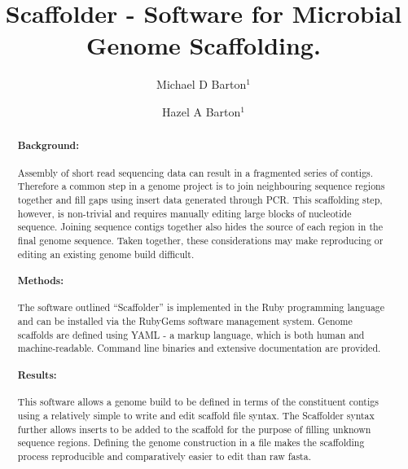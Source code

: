 \documentclass[10pt]{bmc_article}
\newenvironment{bmcformat}{\begin{raggedright}\baselineskip20pt\sloppy\setboolean{publ}{false}}{\end{raggedright}\baselineskip20pt\sloppy}
\begin{document}
\begin{bmcformat}

\title{Scaffolder - Software for Microbial Genome Scaffolding.} %

\author{
  Michael D Barton$^{1}$%
\and
  Hazel A Barton\correspondingauthor$^1$%
      }

\address{\iid(1) Department of Biological Sciences, Northern Kentucky %
University, Nunn Drive, Highland Heights, KY 41076 }%

\maketitle

\clearpage

\begin{abstract} %

  \paragraph*{Background:} Assembly of short read sequencing data can result in
  a fragmented series of contigs. Therefore a common step in a genome project
  is to join neighbouring sequence regions together and fill gaps using insert
  data generated through PCR. This scaffolding step, however, is non-trivial
  and requires manually editing large blocks of nucleotide sequence. Joining
  sequence contigs together also hides the source of each region in the final
  genome sequence. Taken together, these considerations may make reproducing or
  editing an existing genome build difficult.

  \paragraph*{Methods:} The software outlined ``Scaffolder'' is implemented in
  the Ruby programming language and can be installed via the RubyGems software
  management system. Genome scaffolds are defined using YAML - a markup
  language, which is both human and machine-readable. Command line binaries and
  extensive documentation are provided.

  \paragraph*{Results:} This software allows a genome build to be defined in
  terms of the constituent contigs using a relatively simple to write and edit
  scaffold file syntax. The Scaffolder syntax further allows inserts to be
  added to the scaffold for the purpose of filling unknown sequence regions.
  Defining the genome construction in a file makes the scaffolding process
  reproducible and comparatively easier to edit than raw fasta.


\end{abstract}
\end{bmcformat}
\end{document}
